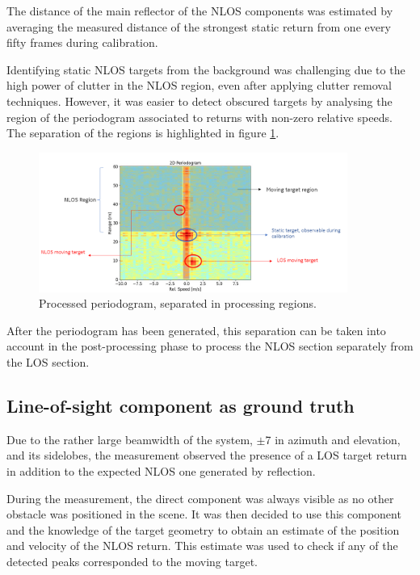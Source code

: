 The distance of the main reflector of the NLOS components was estimated by averaging the measured distance of the strongest static return from one every fifty frames during calibration.

Identifying static NLOS targets from the background was challenging due to the high power of clutter in the NLOS region, even after applying clutter removal techniques. However, it was easier to detect obscured targets by analysing the region of the periodogram associated to returns with non-zero relative speeds. The separation of the regions is highlighted in figure \ref{fig:Test1_nlos_los_separation}.

\begin{figure}[H]
	\centering
	\includegraphics[width=0.9\textwidth]{Images/Test1/nlos-los-separation.png}
	\caption{Processed periodogram, separated in processing regions.}
	\label{fig:Test1_nlos_los_separation}
\end{figure}


After the periodogram has been generated, this separation can be taken into account in the post-processing phase to process the NLOS section separately from the LOS section.

\subsection{Line-of-sight component as ground truth}

Due to the rather large beamwidth of the system, $\pm$7\textdegree\hspace{1pt} in azimuth and elevation, and its sidelobes, the measurement observed the presence of a LOS target return in addition to the expected NLOS one generated by reflection.

During the measurement, the direct component was always visible as no other obstacle was positioned in the scene. It was then decided to use this component and the knowledge of the target geometry to obtain an estimate of the position and velocity of the NLOS return. This estimate was used to check if any of the detected peaks corresponded to the moving target.

